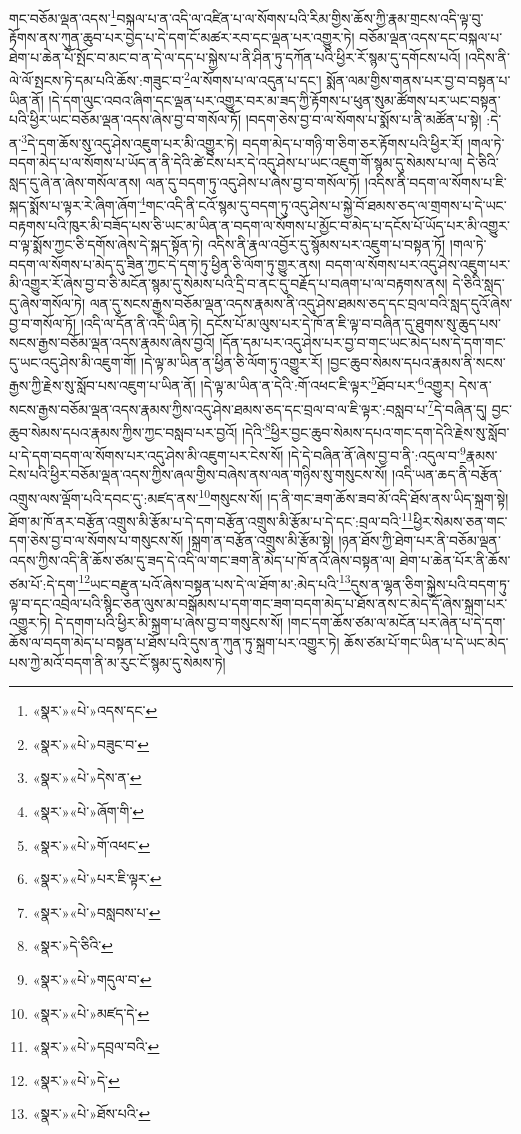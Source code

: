 གང་བཅོམ་ལྡན་འདས་\footnote{«སྣར་»«པེ་»འདས་དང་}བསྐལ་པ་ན་འདི་ལ་འཛིན་པ་ལ་སོགས་པའི་རིམ་གྱིས་ཆོས་ཀྱི་རྣམ་གྲངས་འདི་ལྟ་བུ་རྟོགས་ནས་ཀུན་ཆུབ་པར་བྱེད་པ་དེ་དག་ངོ་མཚར་རབ་དང་ལྡན་པར་འགྱུར་ཏེ། བཅོམ་ལྡན་འདས་དང་བསྐལ་པ་ཐེག་པ་ཆེན་པོ་སྤོང་བ་མང་བ་ན་དེ་ལ་དད་པ་སྐྱེས་པ་ནི་ཤིན་ཏུ་དཀོན་པའི་ཕྱིར་རོ་སྙམ་དུ་དགོངས་པའོ། །འདིས་ནི་ལེ་ལོ་སྤངས་ཏེ་དམ་པའི་ཆོས་:གཟུང་བ་\footnote{«སྣར་»«པེ་»བཟུང་བ་}ལ་སོགས་པ་ལ་འདུན་པ་དང་། སྨོན་ལམ་གྱིས་གནས་པར་བྱ་བ་བསྟན་པ་ཡིན་ནོ། །དེ་དག་ལུང་འབའ་ཞིག་དང་ལྡན་པར་འགྱུར་བར་མ་ཟད་ཀྱི་རྟོགས་པ་ཕུན་སུམ་ཚོགས་པར་ཡང་བསྟན་པའི་ཕྱིར་ཡང་བཅོམ་ལྡན་འདས་ཞེས་བྱ་བ་གསོལ་ཏོ། །བདག་ཅེས་བྱ་བ་ལ་སོགས་པ་སྨོས་པ་ནི་མཚོན་པ་སྟེ། :དེ་ན་\footnote{«སྣར་»«པེ་»དེས་ན་}དེ་དག་ཆོས་སུ་འདུ་ཤེས་འཇུག་པར་མི་འགྱུར་ཏེ། བདག་མེད་པ་གཉི་ག་ཅིག་ཅར་རྟོགས་པའི་ཕྱིར་རོ། །གལ་ཏེ་བདག་མེད་པ་ལ་སོགས་པ་ཡོད་ན་ནི་དེའི་ཚེ་ངེས་པར་དེ་འདུ་ཤེས་པ་ཡང་འཇུག་གོ་སྙམ་དུ་སེམས་པ་ལ། དེ་ཅིའི་སླད་དུ་ཞེ་ན་ཞེས་གསོལ་ནས། ལན་དུ་བདག་ཏུ་འདུ་ཤེས་པ་ཞེས་བྱ་བ་གསོལ་ཏོ། །འདིས་ནི་བདག་ལ་སོགས་པ་ཇི་སྐད་སྨོས་པ་ལྟར་རེ་ཞིག་ཞོག་\footnote{«སྣར་»«པེ་»ཞོག་གི་}གང་འདི་ནི་ངའོ་སྙམ་དུ་བདག་ཏུ་འདུ་ཤེས་པ་སྐྱེ་བོ་ཐམས་ཅད་ལ་གྲགས་པ་དེ་ཡང་བརྟགས་པའི་ཁུར་མི་བཟོད་པས་ཅི་ཡང་མ་ཡིན་ན་བདག་ལ་སོགས་པ་མྱོང་བ་མེད་པ་དངོས་པོ་ཡོད་པར་མི་འགྱུར་བ་ལྟ་སྨོས་ཀྱང་ཅི་དགོས་ཞེས་དེ་སྐད་སྟོན་ཏེ། འདིས་ནི་རྣལ་འབྱོར་དུ་སྙོམས་པར་འཇུག་པ་བསྟན་ཏོ། །གལ་ཏེ་བདག་ལ་སོགས་པ་མེད་དུ་ཟིན་ཀྱང་དེ་དག་ཏུ་ཕྱིན་ཅི་ལོག་ཏུ་གྱུར་ནས། བདག་ལ་སོགས་པར་འདུ་ཤེས་འཇུག་པར་མི་འགྱུར་རོ་ཞེས་བྱ་བ་ཅི་མངོན་སྙམ་དུ་སེམས་པའི་དྲི་བ་ནང་དུ་བརྗོད་པ་བཞག་པ་ལ་བརྟགས་ནས། དེ་ཅིའི་སླད་དུ་ཞེས་གསོལ་ཏེ། ལན་དུ་སངས་རྒྱས་བཅོམ་ལྡན་འདས་རྣམས་ནི་འདུ་ཤེས་ཐམས་ཅད་དང་བྲལ་བའི་སླད་དུའོ་ཞེས་བྱ་བ་གསོལ་ཏོ། །འདི་ལ་དོན་ནི་འདི་ཡིན་ཏེ། དངོས་པོ་མ་ལུས་པར་དེ་ཁོ་ན་ཇི་ལྟ་བ་བཞིན་དུ་ཐུགས་སུ་ཆུད་པས་སངས་རྒྱས་བཅོམ་ལྡན་འདས་རྣམས་ཞེས་བྱའོ། །དོན་དམ་པར་འདུ་ཤེས་པར་བྱ་བ་གང་ཡང་མེད་པས་དེ་དག་གང་དུ་ཡང་འདུ་ཤེས་མི་འཇུག་གོ། །དེ་ལྟ་མ་ཡིན་ན་ཕྱིན་ཅི་ལོག་ཏུ་འགྱུར་རོ། །བྱང་ཆུབ་སེམས་དཔའ་རྣམས་ནི་སངས་རྒྱས་ཀྱི་རྗེས་སུ་སློབ་པས་འཇུག་པ་ཡིན་ནོ། །དེ་ལྟ་མ་ཡིན་ན་དེའི་:གོ་འཕང་ཇི་ལྟར་\footnote{«སྣར་»«པེ་»གོ་འཕང་}ཐོབ་པར་\footnote{«སྣར་»«པེ་»པར་ཇི་ལྟར་}འགྱུར། དེས་ན་སངས་རྒྱས་བཅོམ་ལྡན་འདས་རྣམས་ཀྱིས་འདུ་ཤེས་ཐམས་ཅད་དང་བྲལ་བ་ལ་ཇི་ལྟར་:བསླབ་པ་\footnote{«སྣར་»«པེ་»བསླབས་པ་}དེ་བཞིན་དུ། བྱང་ཆུབ་སེམས་དཔའ་རྣམས་ཀྱིས་ཀྱང་བསླབ་པར་བྱའོ། །དེའི་\footnote{«སྣར་»དེ་ཅིའི་}ཕྱིར་བྱང་ཆུབ་སེམས་དཔའ་གང་དག་དེའི་རྗེས་སུ་སློབ་པ་དེ་དག་བདག་ལ་སོགས་པར་འདུ་ཤེས་མི་འཇུག་པར་ངེས་སོ། །དེ་དེ་བཞིན་ནོ་ཞེས་བྱ་བ་ནི་:འདུལ་བ་\footnote{«སྣར་»«པེ་»གདུལ་བ་}རྣམས་ངེས་པའི་ཕྱིར་བཅོམ་ལྡན་འདས་ཀྱིས་ཞལ་གྱིས་བཞེས་ནས་ལན་གཉིས་སུ་གསུངས་སོ། །འདི་ཡན་ཆད་ནི་བརྩོན་འགྲུས་ལས་ལྡོག་པའི་དབང་དུ་:མཛད་ནས་\footnote{«སྣར་»«པེ་»མཛད་དེ་}གསུངས་སོ། །ད་ནི་གང་ཟག་ཆོས་ཟབ་མོ་འདི་ཐོས་ནས་ཡིད་སྐྲག་སྟེ། ཐོག་མ་ཁོ་ནར་བརྩོན་འགྲུས་མི་རྩོམ་པ་དེ་དག་བརྩོན་འགྲུས་མི་རྩོམ་པ་དེ་དང་:བྲལ་བའི་\footnote{«སྣར་»«པེ་»དབྲལ་བའི་}ཕྱིར་སེམས་ཅན་གང་དག་ཅེས་བྱ་བ་ལ་སོགས་པ་གསུངས་སོ། །སྐྲག་ན་བརྩོན་འགྲུས་མི་རྩོམ་སྟེ། །ཉན་ཐོས་ཀྱི་ཐེག་པར་ནི་བཅོམ་ལྡན་འདས་ཀྱིས་འདི་ནི་ཆོས་ཙམ་དུ་ཟད་དེ་འདི་ལ་གང་ཟག་ནི་མེད་པ་ཁོ་ནའོ་ཞེས་བསྟན་ལ། ཐེག་པ་ཆེན་པོར་ནི་ཆོས་ཙམ་པོ་:དེ་དག་\footnote{«སྣར་»«པེ་»དེ་}ཡང་བརྫུན་པའོ་ཞེས་བསྟན་པས་དེ་ལ་ཐོག་མ་:མེད་པའི་\footnote{«སྣར་»«པེ་»ཐོས་པའི་}དུས་ན་ལྷན་ཅིག་སྐྱེས་པའི་བདག་ཏུ་ལྟ་བ་དང་འབྲེལ་པའི་སྙིང་ཅན་ལུས་མ་བསྒོམས་པ་དག་གང་ཟག་བདག་མེད་པ་ཐོས་ནས་ང་མེད་དོ་ཞེས་སྐྲག་པར་འགྱུར་ཏེ། དེ་དགག་པའི་ཕྱིར་མི་སྐྲག་པ་ཞེས་བྱ་བ་གསུངས་སོ། །གང་དག་ཆོས་ཙམ་ལ་མངོན་པར་ཞེན་པ་དེ་དག་ཆོས་ལ་བདག་མེད་པ་བསྟན་པ་ཐོས་པའི་དུས་ན་ཀུན་ཏུ་སྐྲག་པར་འགྱུར་ཏེ། ཆོས་ཙམ་པོ་གང་ཡིན་པ་དེ་ཡང་མེད་པས་ཀྱེ་མའོ་བདག་ནི་མ་རུང་ངོ་སྙམ་དུ་སེམས་ཏེ། 
